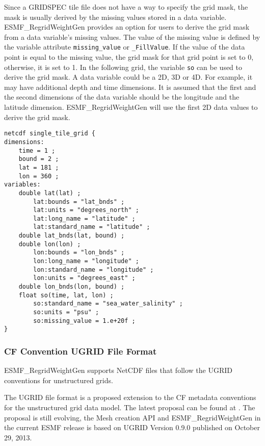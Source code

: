 Since a GRIDSPEC tile file does not have a way to specify the grid mask, the mask is usually derived by the missing values stored in a data variable.  ESMF\_RegridWeightGen provides an option for users to
derive the grid mask from a data variable's missing values.  The value of the missing value is defined by the
variable attribute {\tt missing\_value} or {\tt \_FillValue}.  If the value of the data point is equal to the
missing value, the grid mask for that grid point is set to 0, otherwise, it is set to 1.   In the following
grid, the variable {\tt so} can be used to derive the grid mask.  A data variable could be a 2D, 3D or 4D.
For example, it may have additional depth and time dimensions.
It is assumed that the first and the second dimensions of the data variable should be the longitude and the
latitude dimension.  ESMF\_RegridWeightGen will use the first 2D data values to derive the grid mask.

\begin{verbatim}
netcdf single_tile_grid {
dimensions:
	time = 1 ;
	bound = 2 ;
	lat = 181 ;
	lon = 360 ;
variables:
	double lat(lat) ;
		lat:bounds = "lat_bnds" ;
		lat:units = "degrees_north" ;
		lat:long_name = "latitude" ;
		lat:standard_name = "latitude" ;
	double lat_bnds(lat, bound) ;
	double lon(lon) ;
		lon:bounds = "lon_bnds" ;
		lon:long_name = "longitude" ;
		lon:standard_name = "longitude" ;
		lon:units = "degrees_east" ;
	double lon_bnds(lon, bound) ;
	float so(time, lat, lon) ;
		so:standard_name = "sea_water_salinity" ;
		so:units = "psu" ;
		so:missing_value = 1.e+20f ;
}
\end{verbatim}

\subsubsection{CF Convention UGRID File Format}\label{sec:fileformat:ugrid}

ESMF\_RegridWeightGen supports NetCDF files that follow the UGRID conventions for unstructured grids.

The UGRID file format is a proposed extension to the CF metadata conventions for the unstructured grid data model. The latest proposal can be found at .  The proposal is still evolving, the Mesh creation API and ESMF\_RegridWeightGen in the current ESMF release is based on UGRID Version 0.9.0 published on October 29, 2013.

